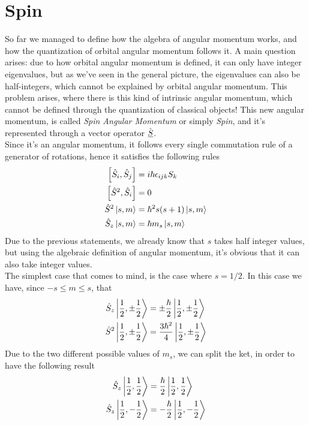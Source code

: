 \documentclass[../qm.tex]{subfiles}
\begin{document}
	\section{Spin}
	So far we managed to define how the algebra of angular momentum works, and how the quantization of orbital angular momentum follows it. A main question arises: due to how orbital angular momentum is defined, it can only have integer eigenvalues, but as we've seen in the general picture, the eigenvalues can also be half-integers, which cannot be explained by orbital angular momentum. This problem arises, where there is this kind of intrinsic angular momentum, which cannot be defined through the quantization of classical objects! This new angular momentum, is called \textit{Spin Angular Momentum} or simply \textit{Spin}, and it's represented through a vector operator $\hat{\underline{S}}$.\\
	Since it's an angular momentum, it follows every single commutation rule of a generator of rotations, hence it satisfies the following rules
	\begin{equation}
		\begin{aligned}
			\comm{\opr{S}_i}{\opr{S}_j}&=i\hbar\lc{ijk}S_k\\
			\comm{\opr{S}^2}{\opr{S}_i}&=0\\
			\opr{S}^2\ket{s,m}&=\hbar^2s(s+1)\ket{s,m}\\
			\opr{S}_z\ket{s,m}&=\hbar m_s\ket{s,m}
		\end{aligned}
		\label{eq:spincomm}
	\end{equation}
	Due to the previous statements, we already know that $s$ takes half integer values, but using the algebraic definition of angular momentum, it's obvious that it can also take integer values.\\
	The simplest case that comes to mind, is the case where $s=1/2$. In this case we have, since $-s\le m\le s$, that
	\begin{equation}
		\begin{aligned}
			\hat{S}_z\ket{\frac{1}{2},\pm\frac{1}{2}}&=\pm\frac{\hbar}{2}\ket{\frac{1}{2},\pm\frac{1}{2}}\\
			\hat{S}^2\ket{\frac{1}{2},\pm\frac{1}{2}}&=\frac{3\hbar^2}{4}\ket{\frac{1}{2},\pm\frac{1}{2}}
		\end{aligned}
		\label{eq:onehalfeigenval}
	\end{equation}
	Due to the two different possible values of $m_s$, we can split the ket, in order to have the following result
	\begin{equation}
		\begin{aligned}
			\hat{S}_z\ket{\frac{1}{2},\frac{1}{2}}&=\frac{\hbar}{2}\ket{\frac{1}{2},\frac{1}{2}}\\
			\hat{S}_z\ket{\frac{1}{2},-\frac{1}{2}}&=-\frac{\hbar}{2}\ket{\frac{1}{2},-\frac{1}{2}}
		\end{aligned}
		\label{eq:szplusminus}
	\end{equation}
\end{document}
